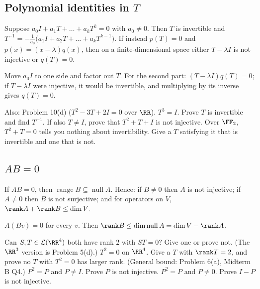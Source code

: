 \documentclass[11pt]{scrartcl}
\DeclareMathOperator{\nul}{null}
\DeclareMathOperator{\range}{range}
\newcommand{\LL}{\mathcal L}
\begin{document}
\subsection{Polynomial identities in \texorpdfstring{$T$}{T}}
\begin{theorem*}[T7]
  Suppose $a_0I+a_1T+\dots+a_kT^k=0$ with $a_0\ne0$. Then $T$ is invertible and
  $T^{-1}=-\frac1{a_0}\big(a_1I+a_2T+\dots+a_kT^{k-1}\big)$.
  If instead $p(T)=0$ and $p(x)=(x-\lambda)q(x)$, then on a finite-dimensional space either $T-\lambda I$ is not injective or $q(T)=0$.
\end{theorem*}
\why Move $a_0I$ to one side and factor out $T$. For the second part: $(T-\lambda I)q(T)=0$; if $T-\lambda I$ were injective, it would be invertible, and multiplying by its inverse gives $q(T)=0$.
\probs
\begin{enumerate}[(a)]
  \ii Also: Problem 10(d) ($T^2-3T+2I=0$ over $\RR$).
  \ii $T^3=I$. Prove $T$ is invertible and find $T^{-1}$. If also $T\ne I$, prove that $T^2+T+I$ is not injective.
  \ii Over $\FF_2$, $T^2+T=0$ tells you nothing about invertibility. Give a $T$ satisfying it that is invertible and one that is not.
\end{enumerate}

\subsection{\texorpdfstring{$AB=0$}{AB=0}}
\begin{theorem*}[T8]
  If $AB=0$, then $\range B\subseteq\nul A$. Hence: if $B\ne0$ then $A$ is not injective; if $A\ne0$ then $B$ is not surjective; and for operators on $V$, $\rank A+\rank B\le\dim V$.
\end{theorem*}
\why $A(Bv)=0$ for every $v$. Then $\rank B\le\dim\nul A=\dim V-\rank A$.
\probs
\begin{enumerate}[(a)]
  \ii Can $S,T\in\LL(\RR^4)$ both have rank $2$ with $ST=0$? Give one or prove not. (The $\RR^3$ version is Problem 5(d).)
  \ii $T^2=0$ on $\RR^4$. Give a $T$ with $\rank T=2$, and prove no $T$ with $T^2=0$ has larger rank. (General bound: Problem 6(a), Midterm B Q4.)
  \ii $P^2=P$ and $P\ne I$. Prove $P$ is not injective. $P^2=P$ and $P\ne0$. Prove $I-P$ is not injective.
\end{enumerate}
\end{document}
